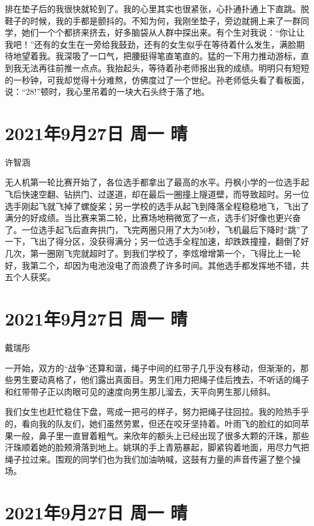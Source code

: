 排在垫子后的我很快就轮到了。我的心里其实也很紧张，心扑通扑通上下直跳。脱鞋子的时候，我的手都是颤抖的。不知为何，我刚坐垫子，旁边就拥上来了一群同学，她们一个个都挤来挤去，好多脑袋从人群中探出来。有个生对我说：“你让让我吧！”还有的女生在一旁给我鼓劲，还有的女生似乎在等待着什么发生，满脸期待地望着我。我深吸了一口气，把腰挺得笔直笔直的。猛的一下用力推动游标，直到我无法再往前推一点点。我抬起头，等待着孙老师报出我的成绩。明明只有短短的一秒钟，可我却觉得十分难熬，仿佛度过了一个世纪。孙老师低头看了看板面，说：“28!”顿时，我心里吊着的一块大石头终于落了地。

\section{2021年9月27日 周一 晴}

许智涵

无人机第一轮比赛开始了，各位选手都拿出了最高的水平。丹枫小学的一位选手起飞后快速空翻、钻拱门、过遂道，却在最后一圈撞上隧道壁，而导致超时。另一位选手刚起飞就飞掉了螺旋桨；另一学校的选手从起飞到降落全程稳稳地飞，飞出了满分的好成绩。当比赛来第二轮，比赛场地稍微宽了一点，选手们好像也更兴奋了。一位选手起飞后直奔拱门，飞完两圈只用了大为50秒，飞机最后下降时“跳”了一下，飞出了得分区，没获得满分；另一位选手全程加速，却跌跌撞撞，翻倒了好几次，第一圈刚飞完就超时了。到我们学校了，李炫增增第一个，飞得比上一轮好，我第二个，却因为电池没电了而浪费了许多时间。其他选手都发挥地不错，共五个人获奖。

\section{2021年9月27日 周一 晴}

戴瑞彤

一开始，双方的“战争”还算和谐，绳子中间的红带子几乎没有移动，但渐渐的，那些男生要动真格了，他们露出真面目。男生们用力把绳子佳后拽去，不听话的绳子和红带带子正以肉眼可见的速度向男生那儿溜去，天平向男生那儿倾斜。

我们女生也赶忙稳住下盘，弯成一把弓的样子，努力把绳子往回拉。我的险热手乎的，看向我的队友们，她们虽然劳累，但还在咬牙坚持着。叶雨飞的脸红的如同苹果一般，鼻子里一直冒着粗气。来欣年的额头上已经出现了很多大颗的汗珠，那些汗珠顺着她的脸颊滑落到地上。姚琪的手上青筋暴起，脚紧钩着地面，用尽力气把绳子拉过来。围观的同学们也为我们加油呐喊，这鼓有力量的声音传遍了整个操场。

\section{2021年9月27日 周一 晴}

